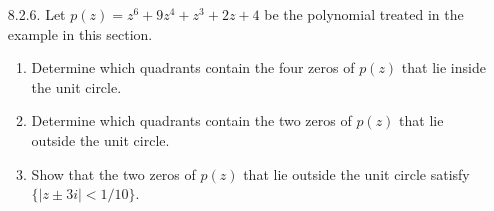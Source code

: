 \documentclass[9pt]{article}
\begin{document}
\begin{enumerate}
   \item[8.2.6.]  Let $p(z) = z^6 + 9z^4 + z^3 + 2z + 4$ be the polynomial
                  treated in the example in this section.
                  \begin{enumerate}
                     \item Determine which quadrants contain the four zeros of
                           $p(z)$ that lie inside the unit circle.
                     \item Determine which quadrants contain the two zeros of
                           $p(z)$ that lie outside the unit circle.
                     \item Show that the two zeros of $p(z)$ that lie outside
                           the unit circle satisfy $\{|z \pm 3i| < 1/10\}$.
                  \end{enumerate}
\end{enumerate}
\end{document}
